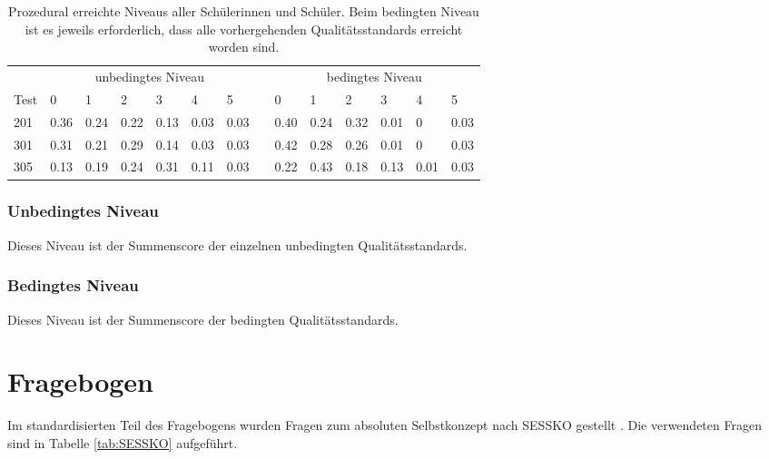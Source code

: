 \begin{table}[htbp]
  \centering
\begin{tabular}{@{}llllllllllllll@{}}
\toprule
 &  \multicolumn{6}{c}{unbedingtes Niveau} &&  \multicolumn{6}{c}{bedingtes Niveau}\\ 
 \cmidrule{2-7} \cmidrule{9-14}
 Test & 0 & 1 & 2 & 3 & 4 & 5 && 0 & 1 & 2 & 3 & 4 & 5\\ 
\midrule
 201 &   0.36 & 0.24 & 0.22 & 0.13 & 0.03 & 0.03 && 0.40 & 0.24 & 0.32  & 0.01 & 0 & 0.03   \\ 
 301 &   0.31 & 0.21 & 0.29 & 0.14 & 0.03 & 0.03  && 0.42 & 0.28 & 0.26 & 0.01 & 0 & 0.03  \\ 
 305 &   0.13 & 0.19 & 0.24 & 0.31 & 0.11 & 0.03  && 0.22 & 0.43 & 0.18 & 0.13 & 0.01 & 0.03 \\ 
\bottomrule
\end{tabular} 
  \caption{Prozedural erreichte Niveaus aller Schülerinnen und Schüler. Beim bedingten Niveau ist es jeweils erforderlich, dass alle vorhergehenden Qualitätsstandards erreicht worden sind.}
  \label{tab:Niveau}
\end{table}

\subsubsection{Unbedingtes Niveau}
Dieses Niveau ist der Summenscore der einzelnen unbedingten Qualitätsstandards.
\subsubsection{Bedingtes Niveau}

Dieses Niveau ist der Summenscore der bedingten Qualitätsstandards. 


\section{Fragebogen}

Im standardisierten Teil des Fragebogens wurden Fragen zum absoluten Selbstkonzept nach SESSKO gestellt \citep{Schone2002}. Die verwendeten Fragen sind in Tabelle \ref{tab:SESSKO} aufgeführt. 



